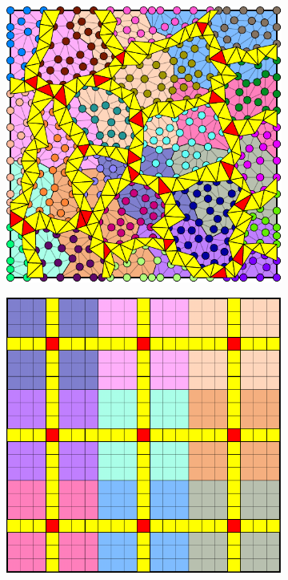 \begin{figure}[htbp]
\begin{subfigure}[t]{0.3\textwidth}
  \end{subfigure}
  \hfill
  \begin{subfigure}[t]{0.3\textwidth}
    \centerline{\includegraphics[width=0.9\linewidth]{figs/square_tria_metis_cell_dual_nomerge}}
  \end{subfigure}
  \par\bigskip
  \begin{subfigure}[t]{0.3\textwidth}
    \centerline{\includegraphics[width=0.9\linewidth]{figs/square_cart_struct_cell_dual}}

\end{subfigure}
\end{figure}
